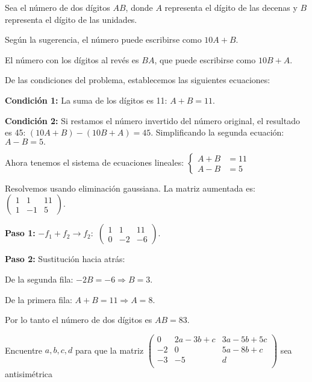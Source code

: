 \begin{myproof}
Sea el número de dos dígitos $AB$, donde $A$ representa el dígito de las decenas y $B$ representa el dígito de las unidades.

Según la sugerencia, el número puede escribirse como $10A + B$.

El número con los dígitos al revés es $BA$, que puede escribirse como $10B + A$.

De las condiciones del problema, establecemos las siguientes ecuaciones:

\textbf{Condición 1:} La suma de los dígitos es 11: $A + B = 11.$

\textbf{Condición 2:} Si restamos el número invertido del número original, el resultado es 45: $(10A + B) - (10B + A) = 45.$ Simplificando la segunda ecuación: $A - B = 5.$

Ahora tenemos el sistema de ecuaciones lineales: $\begin{cases}
A + B &= 11\\
A - B &= 5
\end{cases}$

Resolvemos usando eliminación gaussiana. La matriz aumentada es: $\left(\begin{array}{cc|c}
1 & 1 & 11 \\
1 & -1 & 5
\end{array}\right).$


\textbf{Paso 1:} $-f_1 + f_2 \to f_2:$ $\left(\begin{array}{cc|c}
1 & 1 & 11 \\
0 & -2 & -6
\end{array}\right).$

\textbf{Paso 2:} Sustitución hacia atrás: 

De la segunda fila: $-2B = -6\Rightarrow B = 3.$

De la primera fila: $A + B = 11\Rightarrow A = 8.$

Por lo tanto el número de dos dígitos es $AB = 83$.
\end{myproof}


\begin{prob}
Encuentre $a,b,c,d$ para que la matriz $\left( \begin{array}{ccc}
0&2a-3b+c&3a-5b+5c\\
-2&0&5a-8b+c\\
-3&-5&d\\\end{array} \right)$ sea antisimétrica 
\end{prob}

